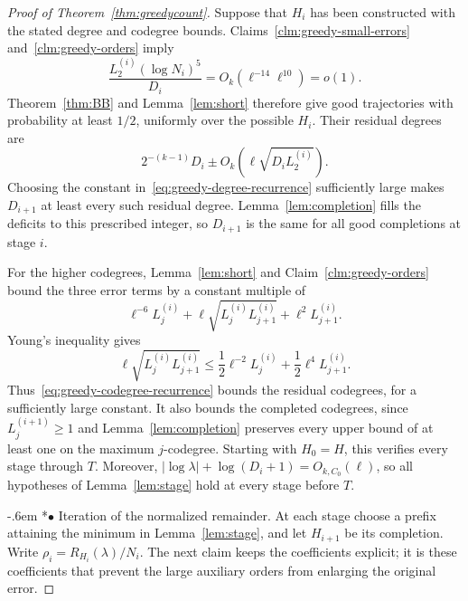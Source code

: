 \documentclass[11pt,reqno]{amsart}
\makeatletter
\numberwithin{equation}{section}
\renewcommand{\paragraph}{\@startsection{paragraph}{4}%
    \z@{.75\linespacing\@plus.2\linespacing\@minus.1\linespacing}%
    {-.6em}%
    {\normalfont\bfseries}}
\newcommand{\proofparagraph}[1]{%
    \paragraph*{$\bullet$ #1}\ignorespaces}
\theoremstyle{plain}
\theoremstyle{definition}
\makeatother
\begin{document}
\begin{proof}[Proof of Theorem~\ref{thm:greedycount}]
    Suppose that $H_i$ has been constructed with the stated degree and codegree bounds.
    Claims~\ref{clm:greedy-small-errors} and~\ref{clm:greedy-orders} imply
    \[
        \frac{L_2^{(i)}(\log N_i)^5}{D_i}
        =O_k(\ell^{-14}\ell^{10})=o(1).
    \]
    Theorem~\ref{thm:BB} and Lemma~\ref{lem:short} therefore give good trajectories with probability at least $1/2$, uniformly over the possible $H_i$.
    Their residual degrees are
    \[
        2^{-(k-1)}D_i\pm O_k(\ell\sqrt{D_iL_2^{(i)}}).
    \]
    Choosing the constant in~\eqref{eq:greedy-degree-recurrence} sufficiently large makes $D_{i+1}$ at least every such residual degree.
    Lemma~\ref{lem:completion} fills the deficits to this prescribed integer, so $D_{i+1}$ is the same for all good completions at stage $i$.

    For the higher codegrees, Lemma~\ref{lem:short} and Claim~\ref{clm:greedy-orders} bound the three error terms by a constant multiple of
    \[
        \ell^{-6}L_j^{(i)}
        +\ell\sqrt{L_j^{(i)}L_{j+1}^{(i)}}
        +\ell^2L_{j+1}^{(i)}.
    \]
    Young's inequality gives
    \[
        \ell\sqrt{L_j^{(i)}L_{j+1}^{(i)}}
        \le\frac12\ell^{-2}L_j^{(i)}
        +\frac12\ell^4L_{j+1}^{(i)}.
    \]
    Thus~\eqref{eq:greedy-codegree-recurrence} bounds the residual codegrees, for a sufficiently large constant.
    It also bounds the completed codegrees, since $L_j^{(i+1)}\ge1$ and Lemma~\ref{lem:completion} preserves every upper bound of at least one on the maximum $j$-codegree.
    Starting with $H_0=H$, this verifies every stage through $T$.
    Moreover, $|\log\lambda|+\log(D_i+1)=O_{k,C_0}(\ell)$, so all hypotheses of Lemma~\ref{lem:stage} hold at every stage before $T$.

    \proofparagraph{Iteration of the normalized remainder.}
    At each stage choose a prefix attaining the minimum in Lemma~\ref{lem:stage}, and let $H_{i+1}$ be its completion.
    Write $\rho_i=R_{H_i}(\lambda)/N_i$.
    The next claim keeps the coefficients explicit; it is these coefficients that prevent the large auxiliary orders from enlarging the original error.


\end{proof}
\end{document}

